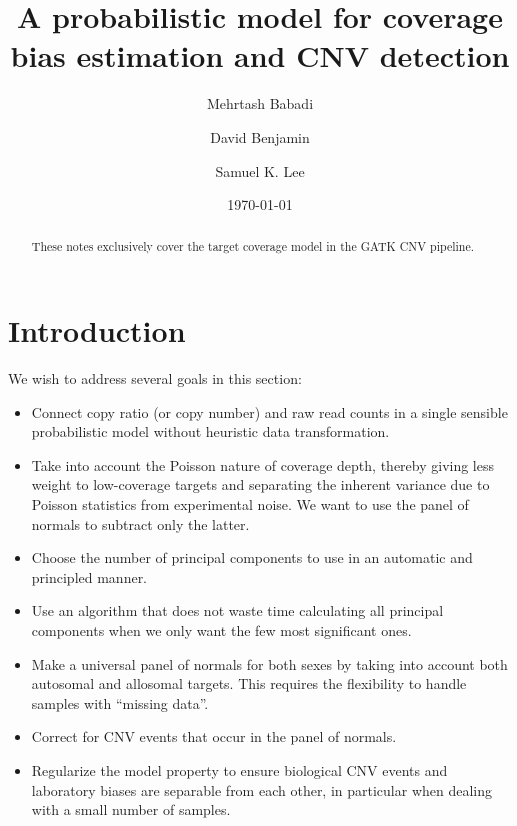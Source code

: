 \documentclass[nofootinbib,amssymb,amsmath]{revtex4}
\begin{document}
\title{A probabilistic model for coverage bias estimation and CNV detection}

\author{Mehrtash Babadi}

\author{David Benjamin}

\author{Samuel K. Lee}

\date{\today}

\begin{abstract}
These notes exclusively cover the target coverage model in the GATK CNV pipeline.
\end{abstract}

\maketitle

\section{Introduction}
\noindent We wish to address several goals in this section:

\begin{itemize}

\item Connect copy ratio (or copy number) and raw read counts in a single sensible probabilistic model without heuristic data transformation.

\item Take into account the Poisson nature of coverage depth, thereby giving less weight to low-coverage targets and separating the inherent variance due to Poisson statistics from experimental noise. We want to use the panel of normals to subtract only the latter.

\item Choose the number of principal components to use in an automatic and principled manner.

\item Use an algorithm that does not waste time calculating all principal components when we only want the few most significant ones.

\item Make a universal panel of normals for both sexes by taking into account both autosomal and allosomal targets. This requires the flexibility to handle samples with ``missing data''.

\item Correct for CNV events that occur in the panel of normals.

\item Regularize the model property to ensure biological CNV events and laboratory biases are separable from each other, in particular when dealing with a small number of samples.

\end{itemize}
\end{document}

